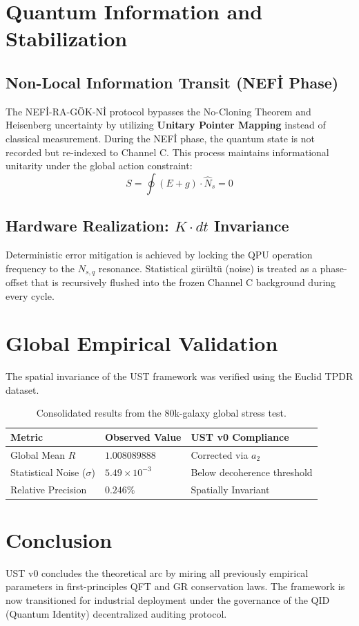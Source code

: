 \documentclass[11pt,a4paper]{article}
\newcommand{\nsq}{N_{s,q}}
\begin{document}
\section{Quantum Information and Stabilization}
\subsection{Non-Local Information Transit (NEFİ Phase)}
The NEFİ-RA-GÖK-Nİ protocol bypasses the No-Cloning Theorem and Heisenberg uncertainty by utilizing \textbf{Unitary Pointer Mapping} instead of classical measurement. During the NEFİ phase, the quantum state is not recorded but re-indexed to Channel C. This process maintains informational unitarity under the global action constraint:
\begin{equation}
    S = \oint \left( E + g \right) \cdot \hat{N}_s = 0
\end{equation}

\subsection {Hardware Realization: $K \cdot dt$ Invariance}
Deterministic error mitigation is achieved by locking the QPU operation frequency to the $\nsq$ resonance. Statistical gürültü (noise) is treated as a phase-offset that is recursively flushed into the frozen Channel C background during every cycle.

\section{Global Empirical Validation}
The spatial invariance of the UST framework was verified using the Euclid TPDR dataset.
\begin{table}[h!]
\centering
\begin{tabular}{@{}lll@{}}
\toprule
\textbf{Metric} & \textbf{Observed Value} & \textbf{UST v0 Compliance} \\ \midrule
Global Mean $R$ & $1.008089888$ & Corrected via $a_2$ \\
Statistical Noise ($\sigma$) & $5.49 \times 10^{-3}$ & Below decoherence threshold \\
Relative Precision & $0.246\%$ & Spatially Invariant \\ \bottomrule
\end{tabular}
\caption{Consolidated results from the 80k-galaxy global stress test.}
\end{table}

\section{Conclusion}
UST v0 concludes the theoretical arc by miring all previously empirical parameters in first-principles QFT and GR conservation laws. The framework is now transitioned for industrial deployment under the governance of the QID (Quantum Identity) decentralized auditing protocol.
\end{document}
